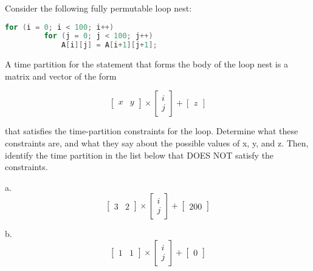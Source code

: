\begin{problem}
Consider the following fully permutable loop nest:
\begin{lstlisting}[language=C,frame=single]
     for (i = 0; i < 100; i++)
         for (j = 0; j < 100; j++)
             A[i][j] = A[i+1][j+1];
\end{lstlisting}
A time partition for the statement that forms the body of the loop nest is a matrix and vector of the form

$$
	\begin{bmatrix}
		x & y
	\end{bmatrix}
	\times
	\begin{bmatrix}
		i \\
		j
	\end{bmatrix}
	+
	\begin{bmatrix}
		z
	\end{bmatrix}
$$


that satisfies the time-partition constraints for the loop. Determine what these constraints are, and what they say about the possible values of x, y, and z. Then, identify the time partition in the list below that DOES NOT satisfy the constraints.



\item a.
$$
	\begin{bmatrix}
		3 & 2
	\end{bmatrix}
	\times
	\begin{bmatrix}
		i \\
		j
	\end{bmatrix}
	+
	\begin{bmatrix}
		200
	\end{bmatrix}
$$

\item b.
$$
	\begin{bmatrix}
		1 & 1
	\end{bmatrix}
	\times
	\begin{bmatrix}
		i \\
		j
	\end{bmatrix}
	+
	\begin{bmatrix}
		0
	\end{bmatrix}
$$


\end{problem}
